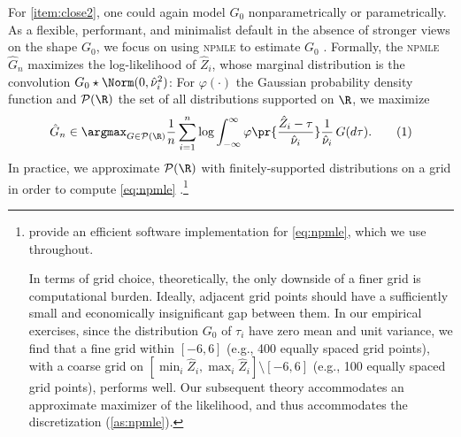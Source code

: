 \documentclass[12pt, reqno]{amsart}
\newcommand\numberthis{\addtocounter{equation}{1}\tag{\theequation}}
\newcommand{\npmle}{\textsc{npmle}}
\numberwithin{equation}{section}
\begin{document}
For \cref{item:close2}, one could again model $G_0$ nonparametrically or parametrically.
As a flexible, performant, and minimalist default in the absence of stronger views on the
shape $G_0$, we focus on using \npmle{} to estimate $G_0$ \citep
{koenker2019comment}. Formally, the
\npmle{} $\hat G_n$ maximizes
the log-likelihood of $\hat Z_i$, whose marginal distribution is the convolution $G_0
\star
\Norm(0,
 \hat\nu_i^2)$: %
 For $\varphi(\cdot)$ the Gaussian probability density function and $\mathcal P(\R)$ the
 set of all distributions supported on $\R$, we maximize
\[
\hat G_n \in \argmax_{G \in \mathcal{P}(\R)} \frac{1}{n} \sum_{i=1}^n \log \int_{-\infty}^\infty \varphi\pr{\frac{\hat Z_i - \tau}{\hat \nu_i}} \frac{1}{\hat \nu_i} \, G(d\tau).
\numberthis \label{eq:npmle}
\]
In practice, we approximate $\mathcal P(\R)$ with finitely-supported distributions on a
grid in order to compute \eqref{eq:npmle}
\citep{koenker2014convex}.\footnote{\citet{koenker2017rebayes} provide an efficient
software implementation for \eqref{eq:npmle}, which we use throughout.

In terms of grid choice, theoretically, the only downside of a finer grid is computational
burden. Ideally, adjacent grid points should have a sufficiently small and economically
insignificant gap between them. In our empirical exercises, since the distribution $G_0$
of $\tau_i$ have zero mean and unit variance, we find that a fine grid within $[-6, 6]$
(e.g., 400 equally spaced grid points), with a coarse grid on $[\min_i \hat Z_i,
\max_i \hat Z_i] \setminus [-6, 6]$ (e.g., 100 equally spaced grid points), performs well.
Our subsequent theory accommodates an approximate maximizer of the likelihood, and thus
accommodates the discretization (\cref{as:npmle}). 
} 
\end{document}
